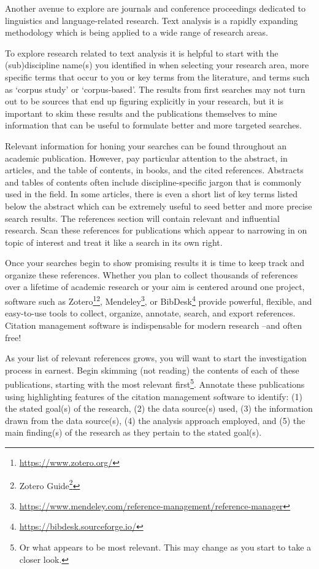 \documentclass[
  letterpaper,
]{latex/krantz}
\theoremstyle{definition}
\theoremstyle{remark}
\DeclareRobustCommand{\href}[2]{#2\footnote{\url{#1}}}
\begin{document}
Another avenue to explore are journals and conference proceedings
dedicated to linguistics and language-related research. Text analysis is
a rapidly expanding methodology which is being applied to a wide range
of research areas.

To explore research related to text analysis it is helpful to start with
the (sub)discipline name(s) you identified in when selecting your
research area, more specific terms that occur to you or key terms from
the literature, and terms such as `corpus study' or `corpus-based'. The
results from first searches may not turn out to be sources that end up
figuring explicitly in your research, but it is important to skim these
results and the publications themselves to mine information that can be
useful to formulate better and more targeted searches.

Relevant information for honing your searches can be found throughout an
academic publication. However, pay particular attention to the abstract,
in articles, and the table of contents, in books, and the cited
references. Abstracts and tables of contents often include
discipline-specific jargon that is commonly used in the field. In some
articles, there is even a short list of key terms listed below the
abstract which can be extremely useful to seed better and more precise
search results. The references section will contain relevant and
influential research. Scan these references for publications which
appear to narrowing in on topic of interest and treat it like a search
in its own right.

Once your searches begin to show promising results it is time to keep
track and organize these references. Whether you plan to collect
thousands of references over a lifetime of academic research or your aim
is centered around one project, software such as
\href{https://www.zotero.org/}{Zotero}\footnote{\href{https://guides.zsr.wfu.edu/zotero}{Zotero
  Guide}},
\href{https://www.mendeley.com/reference-management/reference-manager}{Mendeley},
or \href{https://bibdesk.sourceforge.io/}{BibDesk} provide powerful,
flexible, and easy-to-use tools to collect, organize, annotate, search,
and export references. Citation management software is indispensable for
modern research --and often free!

As your list of relevant references grows, you will want to start the
investigation process in earnest. Begin skimming (not reading) the
contents of each of these publications, starting with the most relevant
first\footnote{Or what appears to be most relevant. This may change as
  you start to take a closer look.}. Annotate these publications using
highlighting features of the citation management software to identify:
(1) the stated goal(s) of the research, (2) the data source(s) used, (3)
the information drawn from the data source(s), (4) the analysis approach
employed, and (5) the main finding(s) of the research as they pertain to
the stated goal(s).
\end{document}
